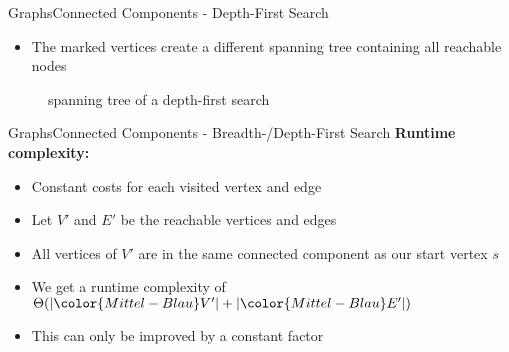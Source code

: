 \begin{frame}{Graphs}{Connected Components - Depth-First Search}
  \begin{itemize}
    \item<2->
      The marked vertices create a different spanning tree containing all
      reachable nodes
  \end{itemize}
  \begin{figure}
    \begin{adjustbox}{width=0.95\linewidth}
      
    \end{adjustbox}
    \caption{spanning tree of a depth-first search}
    \label{fig:graph:depth_first_search_spanning_tree}
  \end{figure}
\end{frame}


\begin{frame}{Graphs}{Connected Components - Breadth-/Depth-First Search}
  \textbf{Runtime complexity:}
  \begin{itemize}
    \item<2->
      Constant costs for each visited vertex and edge
    \item<3->
      Let {\color{Mittel-Blau}$V'$} and {\color{Mittel-Blau}$E'$} be the
      reachable vertices and edges
    \item<4->
      All vertices of {\color{Mittel-Blau}$V'$} are in the same connected
      component as our start vertex {\color{Mittel-Blau}$s$}
    \item<5->
      We get a runtime complexity of
      \begin{math}
        \Theta(\vert {\color{Mittel-Blau}V'} \vert
          + \vert {\color{Mittel-Blau}E'} \vert)
      \end{math}
    \item<6->
      This can only be improved by a constant factor
  \end{itemize}
\end{frame}
